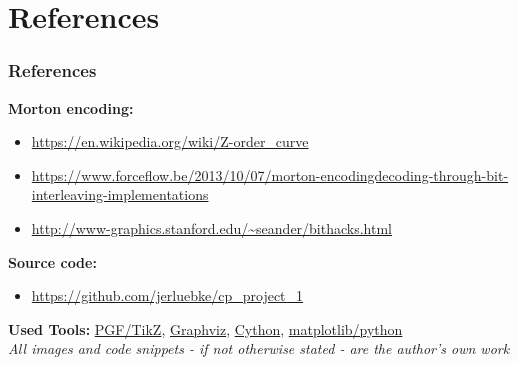 \section{References}
\begin{frame}
    \frametitle{References}
    \textbf{Morton encoding:}
    \begin{itemize}
    \item \url{https://en.wikipedia.org/wiki/Z-order_curve} \\
    \item
        \url{https://www.forceflow.be/2013/10/07/morton-encodingdecoding-through-bit-interleaving-implementations}
        \\
    \item \url{http://www-graphics.stanford.edu/~seander/bithacks.html}
    \end{itemize}
    \textbf{Source code:}
    \begin{itemize}
        \item \url{https://github.com/jerluebke/cp_project_1}
    \end{itemize}
    \textbf{Used Tools:}
    \href{https://sourceforge.net/projects/pgf/}{PGF/TikZ},
    \href{https://graphviz.gitlab.io/}{Graphviz},
    \href{https://cython.org/}{Cython},
    \href{https://matplotlib.org/}{matplotlib/python}
    \vspace*{\baselineskip} \\
    {\footnotesize\textit{All images and code snippets - if not otherwise stated - are
    the author's own work}}
\end{frame}

